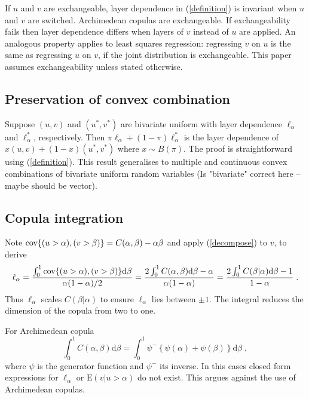 \documentclass[authoryear]{elsarticle}
\newcommand{\cov}{{\rm cov}}
\newcommand{\E}{{\mathrm E}}
\newcommand{\de}{\mathrm{d}}
\newcommand{\eref}[1]{(\ref{#1})}
\begin{document}
If $u$ and $v$ are exchangeable, layer dependence in \eref{definition} is invariant when $u$ and $v$ are switched. Archimedean copulas \citep{mcneil2005qrm} are exchangeable. If exchangeability fails then layer dependence differs when layers of $v$ instead of $u$ are applied. An analogous property applies to least squares regression: regressing $v$ on $u$ is the same as  regressing $u$ on $v$, if the joint distribution is  exchangeable.  This paper assumes exchangeability unless stated otherwise.




\subsection{Preservation of convex combination}

Suppose $(u,v)$ and $(u^*,v^*)$ are bivariate uniform with layer dependence $\ell_\alpha$ and $\ell_\alpha^*$, respectively. Then  $\pi\ell_\alpha+(1-\pi)\ell_\alpha^*$ is the layer dependence of  $x(u,v)+(1-x)(u^*,v^*)$ where $x\sim B(\pi)$.  The proof  is straightforward using \eref{definition}.  This result generalises to
multiple and continuous convex combinations of bivariate uniform random variables  (Is "bivariate" correct here -- maybe should be vector).





\subsection{Copula integration}

Note $\cov\{(u>\alpha),(v>\beta)\}=C(\alpha,\beta)-\alpha\beta$ and apply \eref{decompose} to $v$, to derive
$$
\ell_\alpha = \frac{\int_0^1 \cov\{(u>\alpha),(v>\beta)\} \de\beta }{\alpha(1-\alpha)/2}
= \frac{2 \int_0^1 C(\alpha,\beta) \de \beta- \alpha}{\alpha(1-\alpha)} = \frac{2 \int_0^1 C(\beta|\alpha) \de \beta- 1}{1-\alpha}\;.
$$
Thus $\ell_\alpha$ scales $C(\beta|\alpha)$ to ensure $\ell_\alpha$ lies between $\pm 1$. The  integral reduces the dimension of the copula from two to one.

For Archimedean copula \citep{mcneil2005qrm}
$$
\int_0^1 C(\alpha,\beta) \de \beta = \int_0^1 \psi^-\left\{\psi(\alpha)+\psi(\beta)\right\}\de\beta \;,
$$
where $\psi$ is the generator function and $\psi^-$ its inverse. In this cases closed form expressions for $\ell_\alpha$ or $\E(v|u>\alpha)$  do not exist.   This  argues against the use of Archimedean copulas.
\end{document}
